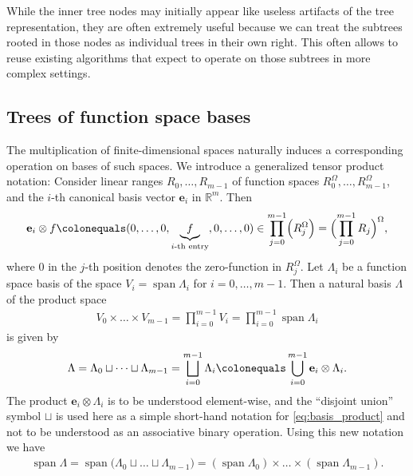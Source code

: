\documentclass[a4paper,10pt,headings=normal,bibliography=totoc]{scrartcl}
\newcommand{\R}{\mathbb{R}}
\begin{document}
While the inner tree nodes may initially appear like useless artifacts of the tree representation, they are often extremely useful
because we can treat the subtrees rooted in those nodes as individual trees in their own right.
This often allows to
reuse existing algorithms that expect to operate on those subtrees in more complex settings.


\subsection{Trees of function space bases}
\label{sec:basistree}

The multiplication of finite-dimensional spaces naturally induces a corresponding operation on bases
of such spaces.  We introduce a generalized tensor product notation:
Consider linear ranges $R_0,\dots,R_{m-1}$ of function spaces $R_0^\Omega,\dots,R_{m-1}^\Omega$,
and the $i$-th canonical basis vector $\mathbf{e}_i$ in $\R^m$.
Then
\begin{align*}
  \mathbf{e}_i \otimes f
  \colonequals (0,\dots,0,\underbrace{f}_{\text{$i$-th entry}},0,\dots,0)
  \in \prod_{j=0}^{m-1} \Bigl(R_j^\Omega\Bigr) = \Bigl(\prod_{j=0}^{m-1} R_j\Bigr)^\Omega,
\end{align*}
where $0$ in the $j$-th position denotes the zero-function in $R_j^\Omega$.
Let $\Lambda_i$ be a function space basis of the space $V_i = \operatorname{span} \Lambda_i$
for $i=0,\dots,m-1$. Then a natural basis $\Lambda$ of the product space
\begin{align*}
  V_0 \times \dots \times V_{m-1}
  = \prod_{i=0}^{m-1} V_i
  = \prod_{i=0}^{m-1} \operatorname{span}\Lambda_i
\end{align*}
is given by
\begin{align}
  \label{eq:basis_product}
  \Lambda =
    \Lambda_0 \sqcup \dots \sqcup \Lambda_{m-1}
    = \bigsqcup_{i=0}^{m-1} \Lambda_i
    \colonequals \bigcup_{i=0}^{m-1} \mathbf{e}_i \otimes \Lambda_i.
\end{align}
The product $\mathbf{e}_i \otimes \Lambda_i$ is to be understood element-wise,
and the ``disjoint union'' symbol $\sqcup$ is used here
as a simple short-hand notation for \eqref{eq:basis_product}
and not to be understood as an associative binary operation.
Using this new notation we have
\begin{align*}
  \operatorname{span} \Lambda
    = \operatorname{span} \bigl( \Lambda_0 \sqcup \dots \sqcup \Lambda_{m-1} \bigr)
    = (\operatorname{span} \Lambda_0) \times \dots \times (\operatorname{span} \Lambda_{m-1}).
\end{align*}
\end{document}
